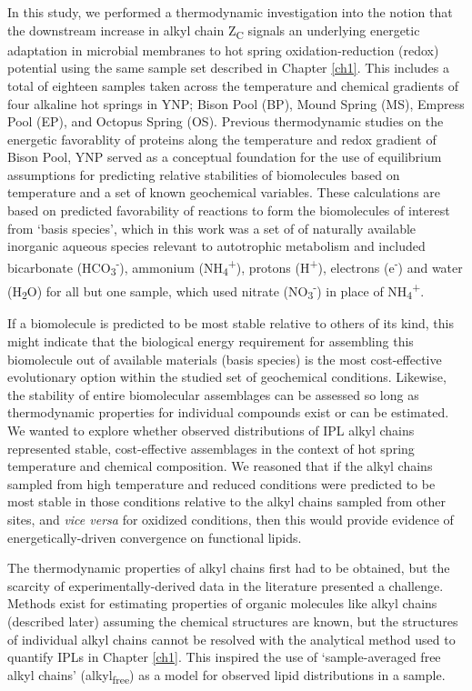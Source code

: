 In this study, we performed a thermodynamic investigation into the notion that the downstream increase in alkyl chain Z\textsubscript{C} signals an underlying energetic adaptation in microbial membranes to hot spring oxidation-reduction (redox) potential using the same sample set described in Chapter \ref{ch1}. This includes a total of eighteen samples taken across the temperature and chemical gradients of four alkaline hot springs in YNP; Bison Pool (BP), Mound Spring (MS), Empress Pool (EP), and Octopus Spring (OS). Previous thermodynamic studies on the energetic favorablity of proteins along the temperature and redox gradient of Bison Pool, YNP \citep{dick2011calculation, dick2013metastable} served as a conceptual foundation for the use of equilibrium assumptions for predicting relative stabilities of biomolecules based on temperature and a set of known geochemical variables. These calculations are based on predicted favorability of reactions to form the biomolecules of interest from `basis species', which in this work was a set of of naturally available inorganic aqueous species relevant to autotrophic metabolism and included bicarbonate (HCO\textsubscript{3}\textsuperscript{-}), ammonium (NH\textsubscript{4}\textsuperscript{+}), protons (H\textsuperscript{+}), electrons (e\textsuperscript{-}) and water (H\textsubscript{2}O) for all but one sample, which used nitrate (NO\textsubscript{3}\textsuperscript{-}) in place of NH\textsubscript{4}\textsuperscript{+}.

If a biomolecule is predicted to be most stable relative to others of its kind, this might indicate that the biological energy requirement for assembling this biomolecule out of available materials (basis species) is the most cost-effective evolutionary option within the studied set of geochemical conditions. Likewise, the stability of entire biomolecular assemblages can be assessed so long as thermodynamic properties for individual compounds exist or can be estimated. We wanted to explore whether observed distributions of IPL alkyl chains represented stable, cost-effective assemblages in the context of hot spring temperature and chemical composition. We reasoned that if the alkyl chains sampled from high temperature and reduced conditions were predicted to be most stable in those conditions relative to the alkyl chains sampled from other sites, and \textit{vice versa} for oxidized conditions, then this would provide evidence of energetically-driven convergence on functional lipids.

The thermodynamic properties of alkyl chains first had to be obtained, but the scarcity of experimentally-derived data in the literature presented a challenge. Methods exist for estimating properties of organic molecules like alkyl chains (described later) assuming the chemical structures are known, but the structures of individual alkyl chains cannot be resolved with the analytical method used to quantify IPLs in Chapter \ref{ch1}. This inspired the use of `sample-averaged free alkyl chains' (alkyl\textsubscript{free}) as a model for observed lipid distributions in a sample.

